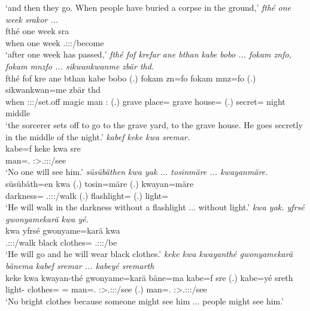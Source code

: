 \begin{exe}
	\trans `and then they go. When people have buried a corpse in the ground,'
	\emph{fthé one week srakor ...}\\
	\gll fthé one week sra\\
	when one week \Tsg.\Masc:\Sbj:\Irr:\Pfv/become\\
	\trans `after one week has passed,'
	\emph{fthé fof krefar ane bthan kabe bobo ... fokam znfo, fokam mnzfo ... sikwankwanme zbär thd.}\\
	\gll fthé fof kre ane bthan kabe bobo (.) fokam zn=fo fokam mnz=fo (.) sikwankwan=me zbär thd\\
	when \Emph{} \Stsg:\Sbj:\Irr:\Pfv/set.off \Dem{} magic man \Med:\All{} (.) grave place=\Loc{} grave house=\Loc{} (.) secret=\Ins{} night middle\\
	\trans `the sorcerer sets off to go to the grave yard, to the grave house. He goes secretly in the middle of the night.'
	\emph{kabef keke kwa sremar.}\\
	\gll kabe=f keke kwa sre\\
	man=\Erg.\Sg{} \Neg{} \Fut{} \Stsg:\Sbj>\Tsg.\Masc:\Obj:\Irr:\Pfv/see\\
	\trans `No one will see him.'
	\emph{süsübäthen kwa yak ... tosinmäre ... kwayanmäre.}\\
	\gll süsübäth=en kwa  (.) tosin=märe (.) kwayan=märe\\
	darkness=\Loc{} \Fut{} \Tsg.\Masc:\Sbj:\Nonpast:\Ipfv/walk (.) flashlight=\Priv{} (.) light=\Priv\\
	\trans `He will walk in the darkness without a flashlight ... without light.'
	\emph{kwa yak. yfrsé gwonyamekarä kwa yé.}\\
	\gll kwa  yfrsé gwonyame=karä kwa \\
	\Fut{} \Tsg.\Masc:\Sbj:\Nonpast:\Ipfv/walk black clothes=\Prop{} \Fut{} \Tsg.\Masc:\Sbj:\Nonpast:\Ipfv/be\\
	\trans `He will go and he will wear black clothes.'
	\emph{keke kwa kwayanthé gwonyamekarä bänema kabef sremar ... kabeyé sremarth}\\
	\gll keke kwa kwayan-thé gwonyame=karä bäne=ma kabe=f sre (.) kabe=yé sreth\\
	\Neg{} \Fut{} light-\Adlzr{} clothes=\Prop{} \Recog=\Char{} man=\Erg.\Sg{} \Stsg:\Sbj>\Tsg.\Masc:\Obj:\Irr:\Pfv/see (.) man=\Erg.\Nsg{} \Stpl:\Sbj>\Tsg.\Masc:\Obj:\Irr:\Pfv/see\\
	\trans `No bright clothes because someone might see him ... people might see him.'

\end{exe}
